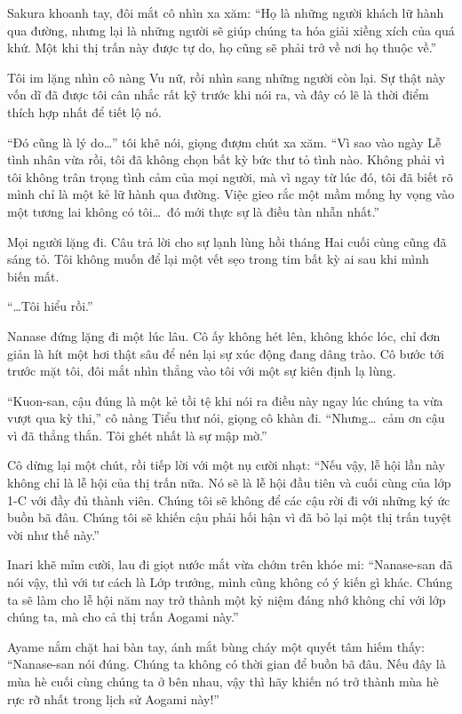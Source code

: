 \documentclass[../main.tex]{subfiles}
\begin{document}
Sakura khoanh tay, đôi mắt cô nhìn xa xăm: ``Họ là những người khách lữ hành qua đường, nhưng lại là những người sẽ giúp chúng ta hóa giải xiềng xích của quá khứ. Một khi thị trấn này được tự do, họ cũng sẽ phải trở về nơi họ thuộc về.''

Tôi im lặng nhìn cô nàng Vu nữ, rồi nhìn sang những người còn lại. Sự thật này vốn dĩ đã được tôi cân nhắc rất kỹ trước khi nói ra, và đây có lẽ là thời điểm thích hợp nhất để tiết lộ nó.

``Đó cũng là lý do\dots'' tôi khẽ nói, giọng đượm chút xa xăm. ``Vì sao vào ngày Lễ tình nhân vừa rồi, tôi đã không chọn bất kỳ bức thư tỏ tình nào. Không phải vì tôi không trân trọng tình cảm của mọi người, mà vì ngay từ lúc đó, tôi đã biết rõ mình chỉ là một kẻ lữ hành qua đường. Việc gieo rắc một mầm mống hy vọng vào một tương lai không có tôi\dots\ đó mới thực sự là điều tàn nhẫn nhất.''

Mọi người lặng đi. Câu trả lời cho sự lạnh lùng hồi tháng Hai cuối cùng cũng đã sáng tỏ. Tôi không muốn để lại một vết sẹo trong tim bất kỳ ai sau khi mình biến mất.

``\dots Tôi hiểu rồi.''

Nanase đứng lặng đi một lúc lâu. Cô ấy không hét lên, không khóc lóc, chỉ đơn giản là hít một hơi thật sâu để nén lại sự xúc động đang dâng trào. Cô bước tới trước mặt tôi, đôi mắt nhìn thẳng vào tôi với một sự kiên định lạ lùng.

``Kuon-san, cậu đúng là một kẻ tồi tệ khi nói ra điều này ngay lúc chúng ta vừa vượt qua kỳ thi,'' cô nàng Tiểu thư nói, giọng cô khàn đi. ``Nhưng\dots\ cảm ơn cậu vì đã thẳng thắn. Tôi ghét nhất là sự mập mờ.''

Cô dừng lại một chút, rồi tiếp lời với một nụ cười nhạt: ``Nếu vậy, lễ hội lần này không chỉ là lễ hội của thị trấn nữa. Nó sẽ là lễ hội đầu tiên và cuối cùng của lớp 1-C với đầy đủ thành viên. Chúng tôi sẽ không để các cậu rời đi với những ký ức buồn bã đâu. Chúng tôi sẽ khiến cậu phải hối hận vì đã bỏ lại một thị trấn tuyệt vời như thế này.''

Inari khẽ mỉm cười, lau đi giọt nước mắt vừa chớm trên khóe mi: ``Nanase-san đã nói vậy, thì với tư cách là Lớp trưởng, mình cũng không có ý kiến gì khác. Chúng ta sẽ làm cho lễ hội năm nay trở thành một kỷ niệm đáng nhớ không chỉ với lớp chúng ta, mà cho cả thị trấn Aogami này.''

Ayame nắm chặt hai bàn tay, ánh mắt bùng cháy một quyết tâm hiếm thấy: ``Nanase-san nói đúng. Chúng ta không có thời gian để buồn bã đâu. Nếu đây là mùa hè cuối cùng chúng ta ở bên nhau, vậy thì hãy khiến nó trở thành mùa hè rực rỡ nhất trong lịch sử Aogami này!''
\end{document}
